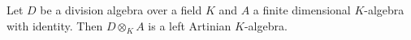 Let $D$ be a division algebra over a field $K$ and $A$ a finite dimensional $K$-algebra with identity. Then $D \otimes_K A$ is a left Artinian $K$-algebra.
